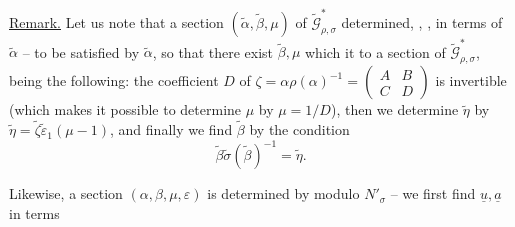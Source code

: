
\uline{Remark.} Let us note that a section $(\widetilde\alpha,\widetilde\beta,\mu)$
\deleted{\unsure{$\in\Gamma$}} of $\widetilde{\mathcal G}^{*}_{\rho,\sigma}$
  determined,
,
  , in terms of $\widetilde\alpha$ --
 to be satisfied by $\widetilde\alpha$, so that
there exist $\widetilde\beta,\mu$  which
 it to a section of $\widetilde{\mathcal G}^{*}_{\rho,\sigma}$,
being the following: the coefficient $D$ of
$\zeta=\alpha\rho(\alpha)^{-1}=\begin{pmatrix}A&B\\C&D\end{pmatrix}$
is invertible (which makes it possible to determine $\mu$ by $\mu=1/D$), then
we determine $\widetilde\eta$  by
$\widetilde\eta=\widetilde\zeta\widetilde\varepsilon_1(\mu-1)$, and
finally we find  $\widetilde\beta$ 
by the condition
\[
\widetilde\beta\widetilde\sigma(\widetilde\beta)^{-1}=\widetilde\eta.
\]



Likewise, a section $(\alpha,\beta,\mu,\varepsilon)$
is determined by 
 modulo
 $N'_\sigma$ -- we first find
$\underline u,\underline a$ in terms


